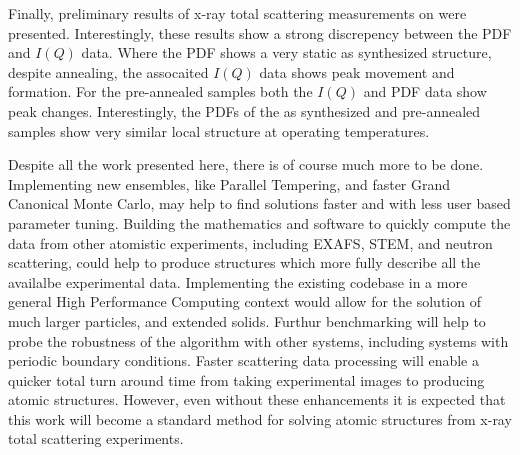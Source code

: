 Finally, preliminary results of x-ray total scattering measurements on  were presented.
Interestingly, these results show a strong discrepency between the PDF and $I(Q)$ data.
Where the PDF shows a very static as synthesized structure, despite annealing, the assocaited $I(Q)$ data shows peak movement and formation.
For the pre-annealed samples both the $I(Q)$ and PDF data show peak changes.
Interestingly, the PDFs of the as synthesized and pre-annealed samples show very similar local structure at operating temperatures.

Despite all the work presented here, there is of course much more to be done.
Implementing new ensembles, like Parallel Tempering, and faster Grand Canonical Monte Carlo, may help to find solutions faster and with less user based parameter tuning.
Building the mathematics and software to quickly compute the data from other atomistic experiments, including EXAFS, STEM, and neutron scattering, could help to produce structures which more fully describe all the availalbe experimental data.
Implementing the existing codebase in a more general High Performance Computing context would allow for the solution of much larger particles, and extended solids.
Furthur benchmarking will help to probe the robustness of the algorithm with other systems, including systems with periodic boundary conditions.
Faster scattering data processing will enable a quicker total turn around time from taking experimental images to producing atomic structures.
However, even without these enhancements it is expected that this work will become a standard method for solving atomic structures from x-ray total scattering experiments.